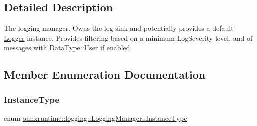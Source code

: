 \subsection{Detailed Description}
The logging manager. Owns the log sink and potentially provides a default \mbox{\hyperlink{classonnxruntime_1_1logging_1_1Logger}{Logger}} instance. Provides filtering based on a minimum Log\+Severity level, and of messages with Data\+Type\+::\+User if enabled. 



\subsection{Member Enumeration Documentation}
\mbox{\label{classonnxruntime_1_1logging_1_1LoggingManager_af3489102aaa98cc9b30fcd5ac641eef6}} 
\subsubsection{\texorpdfstring{Instance\+Type}{InstanceType}}
{\footnotesize\ttfamily enum \mbox{\hyperlink{classonnxruntime_1_1logging_1_1LoggingManager_af3489102aaa98cc9b30fcd5ac641eef6}{onnxruntime\+::logging\+::\+Logging\+Manager\+::\+Instance\+Type}}}

